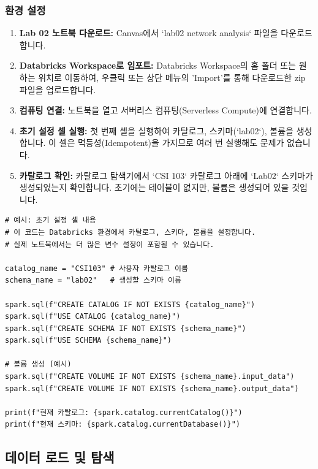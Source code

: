 \documentclass[11pt,a4paper]{article}
\begin{document}
\subsubsection{환경 설정}
\begin{enumerate}
    \item \textbf{Lab 02 노트북 다운로드:} Canvas에서 `lab02 network analysis` 파일을 다운로드합니다.
    \item \textbf{Databricks Workspace로 임포트:} Databricks Workspace의 홈 폴더 또는 원하는 위치로 이동하여, 우클릭 또는 상단 메뉴의 'Import'를 통해 다운로드한 zip 파일을 업로드합니다.
    \item \textbf{컴퓨팅 연결:} 노트북을 열고 서버리스 컴퓨팅(Serverless Compute)에 연결합니다.
    \item \textbf{초기 설정 셀 실행:} 첫 번째 셀을 실행하여 카탈로그, 스키마(`lab02`), 볼륨을 생성합니다. 이 셀은 멱등성(Idempotent)을 가지므로 여러 번 실행해도 문제가 없습니다.
    \item \textbf{카탈로그 확인:} 카탈로그 탐색기에서 `CSI 103` 카탈로그 아래에 `Lab02` 스키마가 생성되었는지 확인합니다. 초기에는 테이블이 없지만, 볼륨은 생성되어 있을 것입니다.
\end{enumerate}

\begin{lstlisting}
# 예시: 초기 설정 셀 내용
# 이 코드는 Databricks 환경에서 카탈로그, 스키마, 볼륨을 설정합니다.
# 실제 노트북에서는 더 많은 변수 설정이 포함될 수 있습니다.

catalog_name = "CSI103" # 사용자 카탈로그 이름
schema_name = "lab02"   # 생성할 스키마 이름

spark.sql(f"CREATE CATALOG IF NOT EXISTS {catalog_name}")
spark.sql(f"USE CATALOG {catalog_name}")
spark.sql(f"CREATE SCHEMA IF NOT EXISTS {schema_name}")
spark.sql(f"USE SCHEMA {schema_name}")

# 볼륨 생성 (예시)
spark.sql(f"CREATE VOLUME IF NOT EXISTS {schema_name}.input_data")
spark.sql(f"CREATE VOLUME IF NOT EXISTS {schema_name}.output_data")

print(f"현재 카탈로그: {spark.catalog.currentCatalog()}")
print(f"현재 스키마: {spark.catalog.currentDatabase()}")
\end{lstlisting}

\subsection{데이터 로드 및 탐색}
\end{document}
